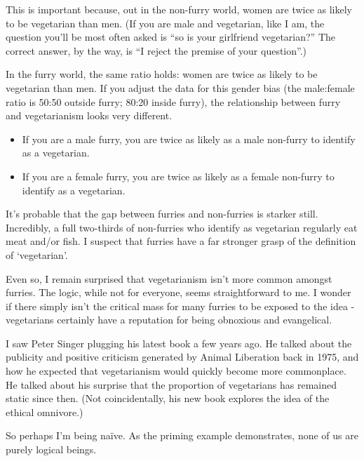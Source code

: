This is important because, out in the non-furry world, women are twice as likely to be vegetarian than men. (If you are male and vegetarian, like I am, the question you'll be most often asked is ``so is your girlfriend vegetarian?'' The correct answer, by the way, is ``I reject the premise of your question''.)

In the furry world, the same ratio holds: women are twice as likely to be vegetarian than men. If you adjust the data for this gender bias (the male:female ratio is 50:50 outside furry; 80:20 inside furry), the relationship between furry and vegetarianism looks very different.

\begin{itemize}
  \item If you are a male furry, you are twice as likely as a male non-furry to identify as a vegetarian.
  \item If you are a female furry, you are twice as likely as a female non-furry to identify as a vegetarian.
\end{itemize}

It's probable that the gap between furries and non-furries is starker still. Incredibly, a full two-thirds of non-furries who identify as vegetarian regularly eat meat and/or fish. I suspect that furries have a far stronger grasp of the definition of `vegetarian'.

Even so, I remain surprised that vegetarianism isn't more common amongst furries. The logic, while not for everyone, seems straightforward to me. I wonder if there simply isn't the critical mass for many furries to be exposed to the idea - vegetarians certainly have a reputation for being obnoxious and evangelical.

I saw Peter Singer plugging his latest book a few years ago. He talked about the publicity and positive criticism generated by Animal Liberation back in 1975, and how he expected that vegetarianism would quickly become more commonplace. He talked about his surprise that the proportion of vegetarians has remained static since then. (Not coincidentally, his new book explores the idea of the ethical omnivore.)

So perhaps I'm being naïve. As the priming example demonstrates, none of us are purely logical beings.
